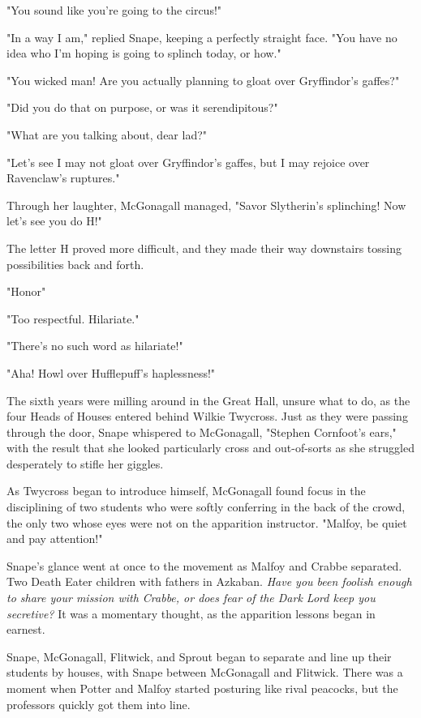 "You sound like you're going to the circus!"

"In a way I am," replied Snape, keeping a perfectly straight face. "You have no idea who I'm hoping is going to splinch today, or how."

"You wicked man! Are you actually planning to gloat over Gryffindor's gaffes?"

"Did you do that on purpose, or was it serendipitous?"

"What are you talking about, dear lad?"

"Let's see{\el} I may not gloat over Gryffindor's gaffes, but I may rejoice over Ravenclaw's ruptures."

Through her laughter, McGonagall managed, "Savor Slytherin's splinching! Now let's see you do H!"

The letter H proved more difficult, and they made their way downstairs tossing possibilities back and forth.

"Honor{\el}"

"Too respectful. Hilariate."

"There's no such word as hilariate!"

"Aha! Howl over Hufflepuff's haplessness!"

The sixth years were milling around in the Great Hall, unsure what to do, as the four Heads of Houses entered behind Wilkie Twycross. Just as they were passing through the door, Snape whispered to McGonagall, "Stephen Cornfoot's ears," with the result that she looked particularly cross and out-of-sorts as she struggled desperately to stifle her giggles.

As Twycross began to introduce himself, McGonagall found focus in the disciplining of two students who were softly conferring in the back of the crowd, the only two whose eyes were not on the apparition instructor. "Malfoy, be quiet and pay attention!"

Snape's glance went at once to the movement as Malfoy and Crabbe separated. Two Death Eater children with fathers in Azkaban. \emph{Have you been foolish enough to share your mission with Crabbe, or does fear of the Dark Lord keep you secretive?} It was a momentary thought, as the apparition lessons began in earnest.

Snape, McGonagall, Flitwick, and Sprout began to separate and line up their students by houses, with Snape between McGonagall and Flitwick. There was a moment when Potter and Malfoy started posturing like rival peacocks, but the professors quickly got them into line.

